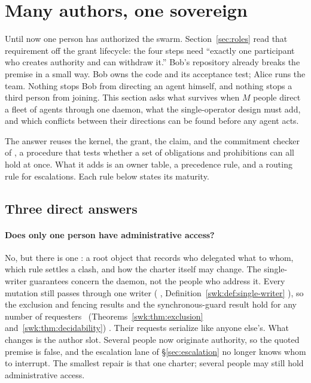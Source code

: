 
\section{Many authors, one sovereign}\label{sec:ls-many-authors}

Until now one person has authorized the swarm. Section~\ref{sec:roles} read
that requirement off the grant lifecycle: the four steps need ``exactly one
participant who creates authority and can withdraw it.'' Bob's repository
already breaks the premise in a small way. Bob owns the code and its
acceptance test; Alice runs the team. Nothing stops Bob from directing an
agent himself, and nothing stops a third person from joining. This section
asks what survives when $M$ people direct a fleet of agents through one daemon,
what the single-operator design must add, and which conflicts between their
directions can be found before any agent acts.

The answer reuses the kernel, the grant, the claim, and the commitment checker
of , a procedure that tests whether a set of
obligations and prohibitions can all hold at once.
What it adds is an owner table, a precedence rule, and a routing rule for
escalations. Each rule below states its maturity.

\subsection{Three direct answers}\label{sec:ls-many-authors-answers}

\paragraph{Does only one person have administrative access?} No, but there is
one : a root object that records who delegated what to whom,
which rule settles a clash, and how the charter itself may change. The single-writer guarantees concern the daemon, not the people
who address it. Every mutation still passes through one writer
(%
\ifpdbook
, Definition~\ref{swk:def:single-writer}%
\fi
), so the exclusion and fencing results and the synchronous-guard result hold
for any number of requesters%
\ifpdbook
\ (Theorems~\ref{swk:thm:exclusion} and~\ref{swk:thm:decidability})%
\fi
. Their requests serialize like anyone else's. What changes is the author
slot. Several people now originate authority, so the quoted premise is
false, and the escalation lane of \S\ref{sec:escalation} no longer knows whom
to interrupt. The smallest repair is that one charter; several people may
still hold administrative access.

